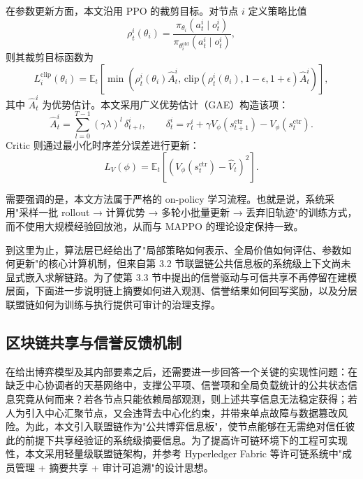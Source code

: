 在参数更新方面，本文沿用 PPO 的裁剪目标\cite{ref4,ref5,ref9}。对节点 $i$ 定义策略比值
\begin{equation}
  \rho_t^i(\theta_i)=\frac{\pi_{\theta_i}(a_t^i\mid o_t^i)}{\pi_{\theta_i^{\mathrm{old}}}(a_t^i\mid o_t^i)},
  \label{eq:ratio}
\end{equation}
则其裁剪目标函数为
\begin{equation}
  L_i^{\mathrm{clip}}(\theta_i)=\mathbb{E}_t\!\left[\min\!\left(\rho_t^i(\theta_i)\hat{A}_t^i,\,
  \mathrm{clip}(\rho_t^i(\theta_i),1-\epsilon,1+\epsilon)\hat{A}_t^i\right)\right],
  \label{eq:ppo_clip}
\end{equation}
其中 $\hat{A}_t^i$ 为优势估计。本文采用广义优势估计（GAE）构造该项：
\begin{equation}
  \hat{A}_t^i=\sum_{l=0}^{T-1}(\gamma\lambda)^l\,\delta_{t+l}^i,\qquad
  \delta_t^i=r_t^i+\gamma V_\phi\!\left(s_{t+1}^{\mathrm{ctr}}\right)-V_\phi\!\left(s_t^{\mathrm{ctr}}\right).
  \label{eq:gae}
\end{equation}
Critic 则通过最小化时序差分误差进行更新：
\begin{equation}
  L_V(\phi)=\mathbb{E}_t\!\left[\left(V_\phi\!\left(s_t^{\mathrm{ctr}}\right)-\hat{V}_t\right)^2\right].
  \label{eq:value_loss}
\end{equation}

需要强调的是，本文方法属于严格的 on-policy 学习流程。也就是说，系统采用"采样一批 rollout → 计算优势 → 多轮小批量更新 → 丢弃旧轨迹"的训练方式，而不使用大规模经验回放池，从而与 MAPPO 的理论设定保持一致。

到这里为止，算法层已经给出了"局部策略如何表示、全局价值如何评估、参数如何更新"的核心计算机制，但来自第 3.2 节联盟链公共信息板的系统级上下文尚未显式嵌入求解链路。为了使第 3.3 节中提出的信誉驱动与可信共享不再停留在建模层面，下面进一步说明链上摘要如何进入观测、信誉结果如何回写奖励，以及分层联盟链如何为训练与执行提供可审计的治理支撑。

\subsection{区块链共享与信誉反馈机制}

在给出博弈模型及其内部要素之后，还需要进一步回答一个关键的实现性问题：在缺乏中心协调者的天基网络中，支撑公平项、信誉项和全局负载统计的公共状态信息究竟从何而来？若各节点只能依赖局部观测，则上述共享信息无法稳定获得；若人为引入中心汇聚节点，又会违背去中心化约束，并带来单点故障与数据篡改风险。为此，本文引入联盟链作为"公共博弈信息板"，使节点能够在无需绝对信任彼此的前提下共享经验证的系统级摘要信息。为了提高许可链环境下的工程可实现性，本文采用轻量级联盟链架构，并参考 Hyperledger Fabric 等许可链系统中"成员管理 + 摘要共享 + 审计可追溯"的设计思想\cite{ref8}。

